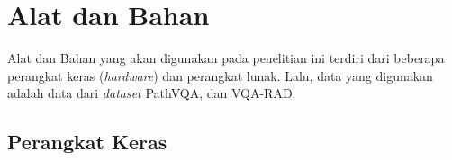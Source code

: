 
\section{Alat dan Bahan}
Alat dan Bahan yang akan digunakan pada penelitian ini terdiri dari beberapa perangkat keras (\textit{hardware}) dan perangkat lunak. Lalu, data yang digunakan adalah data dari \textit{\textit{dataset}} PathVQA, dan VQA-RAD. 

\subsection{Perangkat Keras}

